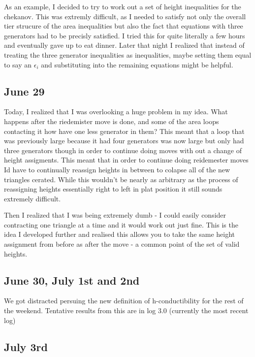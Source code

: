 \documentclass[11pt,oneside]{amsart}
\begin{document}
As an example, I decided to try to work out a set of height inequalities for the chekanov. This was extremly difficult, as I needed to satisfy not only the overall tier strucure of the area inequalities but also the fact that equations with three generators had to be precisly satisfied. I tried this for quite literally a few hours and eventually gave up to eat dinner. Later that night I realized that instead of treating the three generator inequalities as inequalities, maybe setting them equal to say an $\epsilon_i$ and substituting into the remaining equations might be helpful. 


\subsection{June 29}

Today, I realized that I was overlooking a huge problem in my idea. What happens after the riedemister move is done, and some of the area loops contacting it how have one less generator in them? This meant that a loop that was previously large because it had four generators was now large but only had three generators though in order to continue doing moves with out a change of height assigments. This meant that in order to continue doing reidemester moves Id have to continually reassign heights in between to colapse all of the new triangles cerated. While this wouldn't be nearly as arbitrary as the process of reassigning heights essentially right to left in plat position it still sounds extremely difficult. 


Then I realized that I was being extremely dumb  - I could easily consider contracting one triangle at a time and it would work out just fine. This is the idea I developed further and realised this allows you to take the same height assignment from before as after the move - a common point of the set of valid heights.

\subsection{June 30, July 1st and 2nd}

We got distracted persuing the new definition of h-conductibility for the rest of the weekend. Tentative results from this are in log 3.0 (currently the most recent log)


\subsection{July 3rd}
\end{document}
